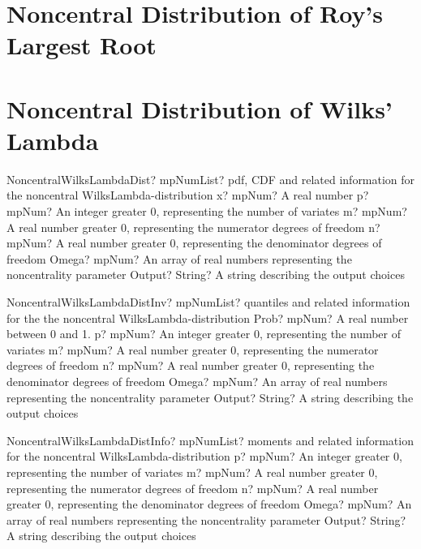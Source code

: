\documentclass[12pt,a4paper,openany]{book}
\begin{document}
\section{Noncentral Distribution of Roy's Largest Root}

\section{Noncentral Distribution of Wilks' Lambda}

\begin{mpFunctionsExtract}
\mpFunctionSixNotImplemented
{NoncentralWilksLambdaDist? mpNumList? pdf, CDF and related information for the noncentral WilksLambda-distribution}
{x? mpNum? A real number}
{p? mpNum? An integer greater 0, representing the number of variates}
{m? mpNum? A real number greater 0, representing the numerator  degrees of freedom}
{n? mpNum? A real number greater 0, representing the denominator degrees of freedom}
{Omega? mpNum? An array of real numbers representing the noncentrality parameter}
{Output? String? A string describing the output choices}
\end{mpFunctionsExtract}

\begin{mpFunctionsExtract}
\mpFunctionSixNotImplemented
{NoncentralWilksLambdaDistInv? mpNumList? quantiles and related information for the the noncentral WilksLambda-distribution}
{Prob? mpNum? A real number between 0 and 1.}
{p? mpNum? An integer greater 0, representing the number of variates}
{m? mpNum? A real number greater 0, representing the numerator  degrees of freedom}
{n? mpNum? A real number greater 0, representing the denominator degrees of freedom}
{Omega? mpNum? An array of real numbers representing the noncentrality parameter}
{Output? String? A string describing the output choices}
\end{mpFunctionsExtract}

\begin{mpFunctionsExtract}
\mpFunctionFiveNotImplemented
{NoncentralWilksLambdaDistInfo? mpNumList? moments and related information for the noncentral WilksLambda-distribution}
{p? mpNum? An integer greater 0, representing the number of variates}
{m? mpNum? A real number greater 0, representing the numerator  degrees of freedom}
{n? mpNum? A real number greater 0, representing the denominator degrees of freedom}
{Omega? mpNum? An array of real numbers representing the noncentrality parameter}
{Output? String? A string describing the output choices}
\end{mpFunctionsExtract}
\end{document}
